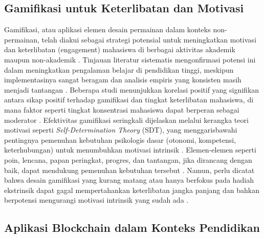 \subsection{Gamifikasi untuk Keterlibatan dan Motivasi}
\label{subsec:gamifikasi_engagement}

\noindent Gamifikasi, atau aplikasi elemen desain permainan dalam konteks non-permainan, telah diakui sebagai strategi potensial untuk meningkatkan motivasi dan keterlibatan (engagement) mahasiswa di berbagai aktivitas akademik maupun non-akademik \cite{gamification_motivation_engagement_chemistry_2021, gamification_in_education_boosting_2025}. Tinjauan literatur sistematis mengonfirmasi potensi ini dalam meningkatkan pengalaman belajar di pendidikan tinggi, meskipun implementasinya sangat beragam dan analisis empiris yang konsisten masih menjadi tantangan \cite{gamification_higher_ed_review_2023}. Beberapa studi menunjukkan korelasi positif yang signifikan antara sikap positif terhadap gamifikasi dan tingkat keterlibatan mahasiswa, di mana faktor seperti tingkat konsentrasi mahasiswa dapat berperan sebagai moderator \cite{gamification_engagement_moderating_concentration_2024}. Efektivitas gamifikasi seringkali dijelaskan melalui kerangka teori motivasi seperti \textit{Self-Determination Theory} (SDT), yang menggarisbawahi pentingnya pemenuhan kebutuhan psikologis dasar (otonomi, kompetensi, keterhubungan) untuk menumbuhkan motivasi intrinsik \cite{sdt_gamification_review_2015, sdt_gamification_duolingo_2025}. Elemen-elemen seperti poin, lencana, papan peringkat, progres, dan tantangan, jika dirancang dengan baik, dapat mendukung pemenuhan kebutuhan tersebut \cite{gamification_elements_performance_2023}. Namun, perlu dicatat bahwa desain gamifikasi yang kurang matang atau hanya berfokus pada hadiah ekstrinsik dapat gagal mempertahankan keterlibatan jangka panjang dan bahkan berpotensi mengurangi motivasi intrinsik yang sudah ada \cite{gamification_in_education_boosting_2025, gamification_higher_ed_review_2023}.

\subsection{Aplikasi Blockchain dalam Konteks Pendidikan}
\label{subsec:blockchain_pendidikan}

